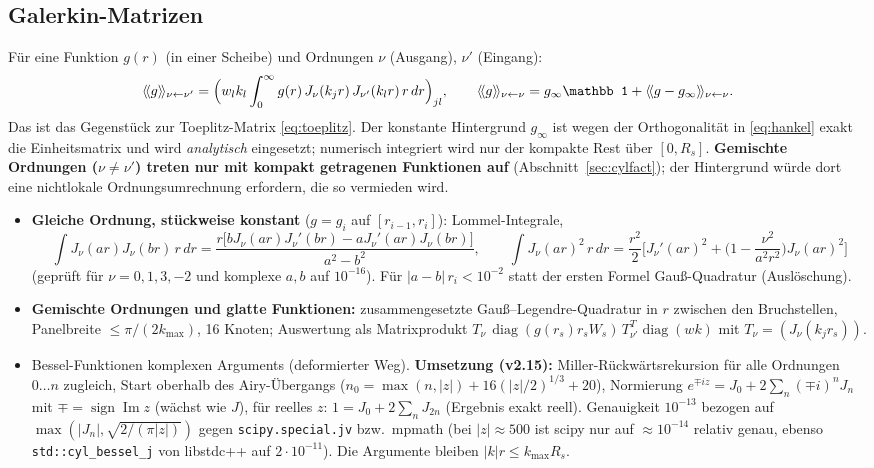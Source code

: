 \subsection{Galerkin-Matrizen}\label{sec:cylgal}
Für eine Funktion $g(r)$ (in einer Scheibe) und Ordnungen $\nu$ (Ausgang), $\nu'$ (Eingang):
\begin{equation}
  \hk{g}_{\nu\leftarrow\nu'}=\Big(w_lk_l\int_0^\infty g(r)\,J_\nu(k_jr)\,J_{\nu'}(k_lr)\,r\,dr\Big)_{jl},\qquad
  \hk{g}_{\nu\leftarrow\nu}=g_\infty\mathbb 1+\hk{g-g_\infty}_{\nu\leftarrow\nu}.
  \label{eq:cyl_gal}
\end{equation}
Das ist das Gegenstück zur Toeplitz-Matrix \eqref{eq:toeplitz}. Der konstante Hintergrund $g_\infty$ ist wegen der
Orthogonalität in \eqref{eq:hankel} exakt die Einheitsmatrix und wird \emph{analytisch} eingesetzt; numerisch
integriert wird nur der kompakte Rest über $[0,R_s]$. \textbf{Gemischte Ordnungen ($\nu\ne\nu'$) treten nur mit
kompakt getragenen Funktionen auf} (Abschnitt~\ref{sec:cylfact}); der Hintergrund würde dort eine nichtlokale
Ordnungsumrechnung erfordern, die so vermieden wird.
\begin{itemize}[nosep]
  \item \textbf{Gleiche Ordnung, stückweise konstant} ($g=g_i$ auf $[r_{i-1},r_i]$): Lommel-Integrale,
        \begin{equation}
          \int J_\nu(ar)J_\nu(br)\,r\,dr=\frac{r\big[bJ_\nu(ar)J_\nu'(br)-aJ_\nu'(ar)J_\nu(br)\big]}{a^2-b^2},\qquad
          \int J_\nu(ar)^2\,r\,dr=\frac{r^2}2\Big[J_\nu'(ar)^2+\Big(1-\frac{\nu^2}{a^2r^2}\Big)J_\nu(ar)^2\Big]
          \label{eq:lommel}
        \end{equation}
        (geprüft für $\nu=0,1,3,-2$ und komplexe $a,b$ auf $10^{-16}$). Für $|a-b|\,r_i<10^{-2}$ statt der ersten Formel
        Gauß-Quadratur (Auslöschung).
  \item \textbf{Gemischte Ordnungen und glatte Funktionen:} zusammengesetzte Gauß--Legendre-Quadratur in $r$ zwischen den
        Bruchstellen, Panelbreite $\le\pi/(2k_{\max})$, 16 Knoten; Auswertung als Matrixprodukt
        $T_\nu\,\operatorname{diag}(g(r_s)r_sW_s)\,T_{\nu'}^T\operatorname{diag}(wk)$ mit $T_\nu=(J_\nu(k_jr_s))$.
  \item Bessel-Funktionen komplexen Arguments (deformierter Weg). \textbf{Umsetzung (v2.15):} Miller-Rückwärtsrekursion
        für alle Ordnungen $0\dots n$ zugleich, Start oberhalb des Airy-Übergangs ($n_0=\max(n,|z|)+16(|z|/2)^{1/3}+20$),
        Normierung $e^{\mp iz}=J_0+2\sum_n(\mp i)^nJ_n$ mit $\mp=\operatorname{sign}\operatorname{Im}z$ (wächst wie $J$),
        für reelles $z$: $1=J_0+2\sum_nJ_{2n}$ (Ergebnis exakt reell). Genauigkeit $10^{-13}$ bezogen auf
        $\max(|J_n|,\sqrt{2/(\pi|z|)})$ gegen \verb|scipy.special.jv| bzw.\ mpmath (bei $|z|\approx500$ ist scipy nur auf
        $\approx10^{-14}$ relativ genau, ebenso \verb|std::cyl_bessel_j| von libstdc++ auf $2\cdot10^{-11}$). Die
        Argumente bleiben $|k|r\le k_{\max}R_s$.
\end{itemize}

